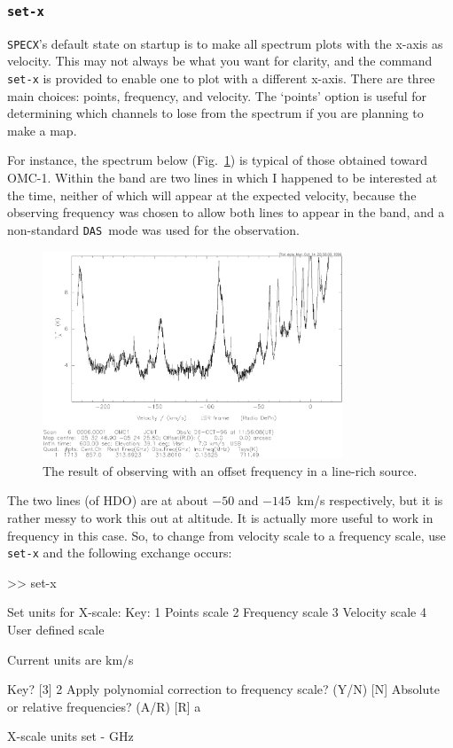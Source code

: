 \documentclass[11pt,twoside]{starlink}
\providecommand{\SPECX}{\texttt{SPECX}}
\providecommand{\das}{\texttt{DAS}}
\begin{document}
\subsubsection{\texttt{set-x}}
\label{sec:set-x}
\SPECX 's default state on startup is to make all spectrum plots with
the x-axis as velocity. This may not always be what you want for
clarity, and the command \texttt{set-x} is provided to enable one to plot
with a different x-axis. There are three main choices: points,
frequency, and velocity. The `points' option is useful for determining
which channels to lose from the spectrum if you are planning to make a
map.

For instance, the spectrum below (Fig.~\ref{fig:set-x-orig})
is typical of those obtained toward
OMC-1. Within the band are two lines in which I happened to be
interested at the time, neither of which will appear at the expected
velocity, because the observing frequency was chosen to allow both
lines to appear in the band, and a non-standard \das\ mode was used
for the observation.

\begin{figure}[ht]
\centering
\includegraphics[width=0.8\textwidth]{sc8_hdo-orig}
\caption[A messy spectrum]
{\small{The result of observing with an offset frequency in a
line-rich source.
}}
\label{fig:set-x-orig}
\end{figure}

The two lines (of HDO) are at about $-50$ and $-145$~km/s
respectively, but it is rather messy to work this out at altitude.  It
is actually more useful to work in frequency in this case. So,
to change from velocity scale to a frequency scale, use \texttt{set-x}
and the following exchange occurs:

\begin{terminalv}
 >> set-x

 Set units for X-scale:
 Key:    1      Points scale
         2      Frequency scale
         3      Velocity scale
         4      User defined scale

    Current units are km/s

 Key?  [3] 2
 Apply polynomial correction to frequency scale? (Y/N) [N]
 Absolute or relative frequencies? (A/R) [R] a

 X-scale units set - GHz
\end{terminalv}
\end{document}
